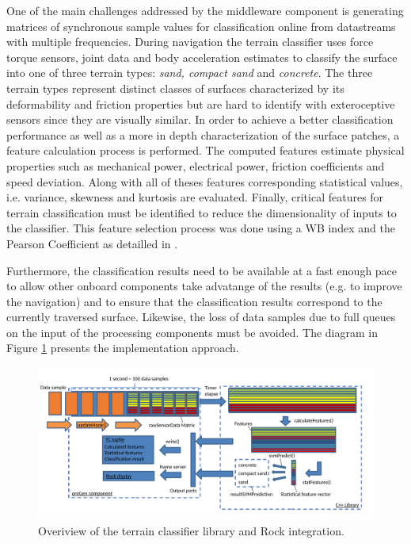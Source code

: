 \documentclass{article}
\begin{document}
One of the main challenges addressed by the middleware component is generating matrices of synchronous sample values for classification online from datastreams with multiple frequencies.
During navigation the terrain classifier uses force torque sensors, joint data and body acceleration estimates to classify the surface into one of three terrain types: \emph{sand, compact sand} and \emph{concrete}.
The three terrain types represent distinct classes of surfaces characterized by its deformability and friction properties but are hard to identify with exteroceptive sensors since they are visually similar.
In order to achieve a better classification performance as well as a more in depth characterization of the surface patches, a feature calculation process is performed. 
The computed features estimate physical properties such as mechanical power, electrical power, friction coefficients and speed deviation. Along with all of theses features corresponding statistical values, i.e. variance, skewness and kurtosis are evaluated. 
Finally, critical features for terrain classification must be identified to reduce the dimensionality of inputs to the classifier.
This feature selection process was done using a WB index and the Pearson Coefficient as detailled in \cite{Dimastrogiovanni2020}. 

Furthermore, the classification results need to be available at a fast enough pace to allow other onboard components take advatange of the results (e.g. to improve the navigation) and to ensure that the classification results correspond to the currently traversed surface. 
Likewise, the loss of data samples due to full queues on the input of the processing components must be avoided. 
The diagram in Figure \ref{fig:overview} presents the implementation approach.

\begin{figure}
\centering
\includegraphics[width=\textwidth]{../figures/OverviewTC2.pdf}
\caption{\label{fig:overview}Overiview of the terrain classifier library and Rock integration.}
\end{figure}
\end{document}

